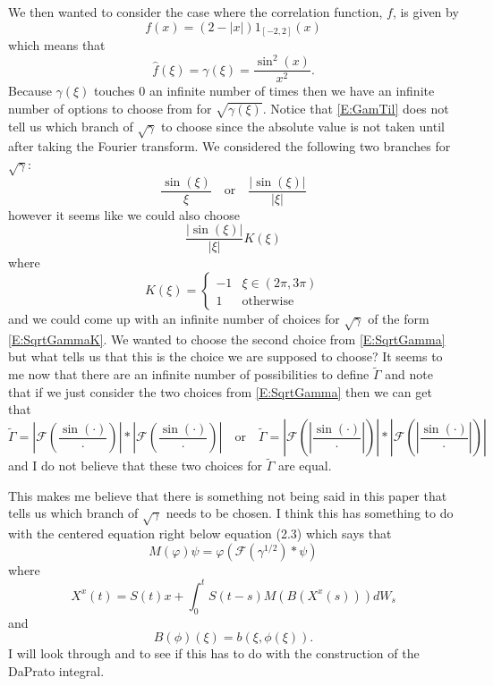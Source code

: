 \documentclass{article}
\numberwithin{equation}{section}
\begin{document}
We then wanted to consider the case where the correlation function, $f$, is given by
	\[
		f(x) =(2-|x|)1_{[-2,2]}(x)
	\]
which means that
	\[
		\hat{f}(\xi) = \gamma(\xi) = \frac{\sin^2(x)}{x^2}.
	\]
Because $\gamma(\xi)$ touches $0$ an infinite number of times then we have an infinite number of options to choose from for $\sqrt{\gamma(\xi)}$. Notice that \eqref{E:GamTil} does not tell us which branch of $\sqrt{\gamma}$ to choose since the absolute value is not taken until after taking the Fourier transform. We considered the following two branches for $\sqrt{\gamma}$:
	\begin{equation}\label{E:SqrtGamma}
		\frac{\sin(\xi)}{\xi} \quad \text{or} \quad \frac{|\sin(\xi)|}{|\xi|}
	\end{equation}
however it seems like we could also choose
	\begin{equation}\label{E:SqrtGammaK}
		\frac{|\sin(\xi)|}{|\xi|} K(\xi)
	\end{equation}
where
	\[ K(\xi) =
		\begin{cases}
			-1 & \xi \in (2\pi, 3\pi)
			\\ 1 & \text{otherwise}
		\end{cases}
	\]
and we could come up with an infinite number of choices for $\sqrt{\gamma}$ of the form \eqref{E:SqrtGammaK}. We wanted to choose the second choice from \eqref{E:SqrtGamma} but what tells us that this is the choice we are supposed to choose? It seems to me now that there are an infinite number of possibilities to define $\tilde{\Gamma}$ and note that if we just consider the two choices from \eqref{E:SqrtGamma} then we can get that
	\[
		\tilde{\Gamma} = \left| \mathcal{F}\left(\frac{\sin(\cdot)}{\cdot} \right) \right|* \left| \mathcal{F}\left(\frac{\sin(\cdot)}{\cdot} \right) \right|
			\quad	\text{or}	\quad
		\tilde{\Gamma} = \left| \mathcal{F}\left(\left|\frac{\sin(\cdot)}{\cdot} \right|\right) \right|* \left| \mathcal{F}\left(\left|\frac{\sin(\cdot)}{\cdot} \right| \right) \right|
	\]
and I do not believe that these two choices for $\tilde{\Gamma}$ are equal.

This makes me believe that there is something not being said in this paper that tells us which branch of $\sqrt{\gamma}$ needs to be chosen. I think this has something to do with the centered equation right below equation (2.3) \cite{TZ98} which says that
	\begin{equation}\label{E:SqrtGammaM}
		M(\varphi)\psi = \varphi(\mathcal{F}(\gamma^{1/2}) * \psi)
	\end{equation}
where
	\[
		X^x(t) = S(t)x + \int_0^t S(t-s)M(B(X^x(s))) dW_s
	\]
and
	\[
		B(\phi)(\xi) = b(\xi,\phi(\xi)).
	\]
I will look through \cite{DZ92} and \cite{DZp92} to see if this has to do with the construction of the DaPrato integral.
\end{document}
